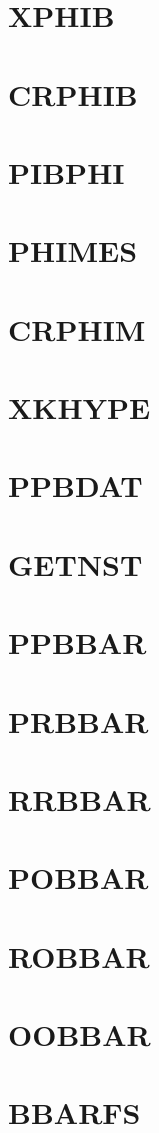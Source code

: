\documentclass[14pt,UTF8]{ctexbook}
\begin{document}
\section{XPHIB}
\section{CRPHIB}
\section{PIBPHI}
\section{PHIMES}
\section{CRPHIM}
\section{XKHYPE}
\section{PPBDAT}
\section{GETNST}
\section{PPBBAR}
\section{PRBBAR}
\section{RRBBAR}
\section{POBBAR}
\section{ROBBAR}
\section{OOBBAR}
\section{BBARFS}
\end{document}
